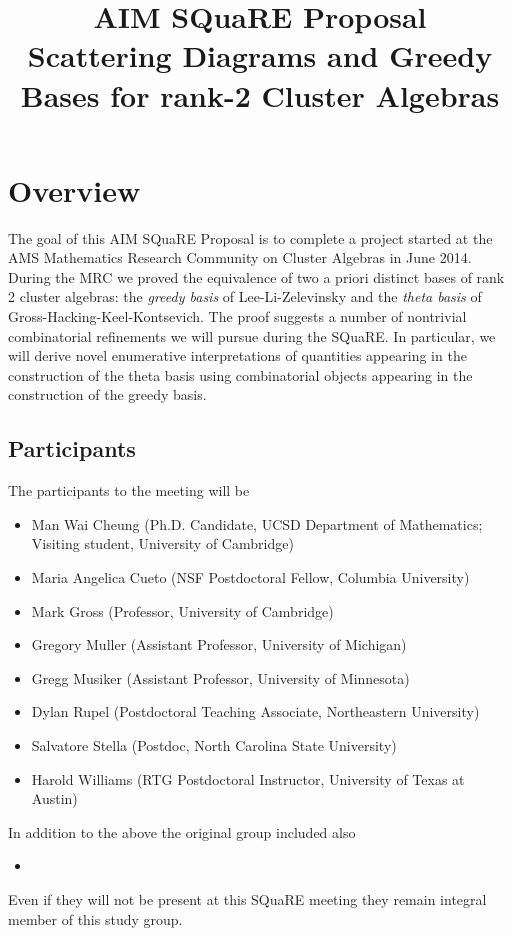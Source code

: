 \documentclass{amsart}
\title[\small{Scattering Diagrams and Greedy Bases for rank-2 Cluster Algebras}]
  {AIM SQuaRE Proposal\\ 
  \small{Scattering Diagrams and Greedy Bases for rank-2 Cluster Algebras}}
\begin{document}
  \maketitle
  
  \section*{Overview}
    The goal of this AIM SQuaRE Proposal is to complete a project started at the
    AMS Mathematics Research Community on Cluster Algebras in June 2014. 
    During the MRC we proved the equivalence of two a priori
    distinct bases of rank 2 cluster algebras: the \emph{greedy basis} of
    Lee-Li-Zelevinsky and the \emph{theta basis} of
    Gross-Hacking-Keel-Kontsevich.  The proof suggests a number of nontrivial combinatorial refinements we will 
    pursue during the SQuaRE.  In particular, we will derive novel enumerative interpretations of quantities 
    appearing in the construction of the theta basis using combinatorial objects appearing 
    in the construction of the greedy basis.  
  
  \subsection*{Participants}
    The participants to the meeting will be 
    \begin{itemize}
      \item Man Wai Cheung (Ph.D. Candidate, UCSD Department of Mathematics;
          Visiting student, University of Cambridge)
      \item Maria Angelica Cueto (NSF Postdoctoral Fellow, Columbia University)
      \item Mark Gross (Professor, University of Cambridge)
      \item Gregory Muller (Assistant Professor, University of Michigan)
      \item Gregg Musiker (Assistant Professor, University of Minnesota)
      \item Dylan Rupel (Postdoctoral Teaching Associate, Northeastern
          University)
      \item Salvatore Stella (Postdoc, North Carolina State University)
      \item Harold Williams (RTG Postdoctoral Instructor, University of 
          Texas at Austin) 
    \end{itemize}
    In addition to the above the original group included also
    \begin{itemize}
      \item
    \end{itemize}
    Even if they will not be present at this SQuaRE meeting they remain integral
    member of this study group. 
  
\end{document}
